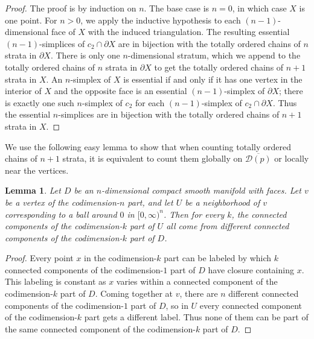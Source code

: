 \documentclass[psamsfonts]{amsart}
\newtheorem{lemma}[theorem]{Lemma}
\theoremstyle{remark}
\newcommand{\del}{\partial}
\begin{document}
\begin{proof}
The proof is by induction on $n$.  The base case is $n = 0$, in which case $X$ is one point.  For $n > 0$, we apply the inductive hypothesis to each $(n-1)$-dimensional face of $X$ with the induced triangulation.  The resulting essential $(n-1)$-simplices of $c_2 \cap \del X$ are in bijection with the totally ordered chains of $n$ strata in $\del X$.  There is only one $n$-dimensional stratum, which we append to the totally ordered chains of $n$ strata in $\del X$ to get the totally ordered chains of $n+1$ strata in $X$.  An $n$-simplex of $X$ is essential if and only if it has one vertex in the interior of $X$ and the opposite face is an essential $(n-1)$-simplex of $\del X$; there is exactly one such $n$-simplex of $c_2$ for each $(n-1)$-simplex of $c_2 \cap \del X$.  Thus the essential $n$-simplices are in bijection with the totally ordered chains of $n+1$ strata in $X$.
\end{proof}

We use the following easy lemma to show that when counting totally ordered chains of $n+1$ strata, it is equivalent to count them globally on $\overline{\mathcal{D}(p)}$ or locally near the vertices.

\begin{lemma}\label{faces}
Let $D$ be an $n$-dimensional compact smooth manifold with faces.  Let $v$ be a vertex of the codimension-$n$ part, and let $U$ be a neighborhood of $v$ corresponding to a ball around $0$ in $[0, \infty)^n$.  Then for every $k$, the connected components of the codimension-$k$ part of $U$ all come from different connected components of the codimension-$k$ part of $D$.
\end{lemma}

\begin{proof}
Every point $x$ in the codimension-$k$ part can be labeled by which $k$ connected components of the codimension-$1$ part of $D$ have closure containing $x$.  This labeling is constant as $x$ varies within a connected component of the codimension-$k$ part of $D$.  Coming together at $v$, there are $n$ different connected components of the codimension-$1$ part of $D$, so in $U$ every connected component of the codimension-$k$ part gets a different label.  Thus none of them can be part of the same connected component of the codimension-$k$ part of $D$.
\end{proof}
\end{document}
